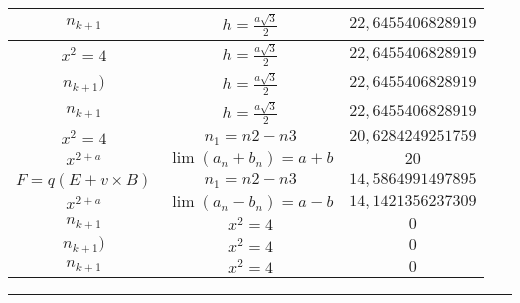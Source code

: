 \documentclass{article}
\begin{document}
\begin{flushleft}
\begin{longtable}{|c|c|c|}
$n_{k+1}$ & $h=\frac{a\sqrt{3}}{2}$ & $22,6455406828919$ \\ \hline 
$x^2=4$ & $h=\frac{a\sqrt{3}}{2}$ & $22,6455406828919$ \\ \hline 
$n_{k+1})$ & $h=\frac{a\sqrt{3}}{2}$ & $22,6455406828919$ \\ \hline 
$n_{k+1}$ & $h=\frac{a\sqrt{3}}{2}$ & $22,6455406828919$ \\ \hline 
$x^2=4$ & $n_{1}={n{2}-n{3}}$ & $20,6284249251759$ \\ \hline 
$x^{2+a}$ & $\lim\left(a_n+b_n\right)=a+b$ & $20$ \\ \hline 
$F=q\left(E+v\times B\right)$ & $n_{1}={n{2}-n{3}}$ & $14,5864991497895$ \\ \hline 
$x^{2+a}$ & $\lim\left(a_n-b_n\right)=a-b$ & $14,1421356237309$ \\ \hline 
$n_{k+1}$ & $x^2=4$ & $0$ \\ \hline 
$n_{k+1})$ & $x^2=4$ & $0$ \\ \hline 
$n_{k+1}$ & $x^2=4$ & $0$ \\ \hline 
\end{longtable} 

\end{flushleft}
\hrule
\end{document}
